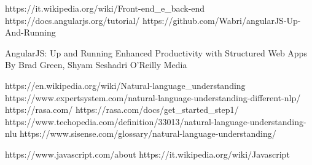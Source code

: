 \begin{thebibliography}{99}

https://it.wikipedia.org/wiki/Front-end_e_back-end
https://docs.angularjs.org/tutorial/
https://github.com/Wabri/angularJS-Up-And-Running

AngularJS: Up and Running
Enhanced Productivity with Structured Web Apps
By Brad Green, Shyam Seshadri 
O'Reilly Media

https://en.wikipedia.org/wiki/Natural-language_understanding
https://www.expertsystem.com/natural-language-understanding-different-nlp/
https://rasa.com/
https://rasa.com/docs/get_started_step1/
https://www.techopedia.com/definition/33013/natural-language-understanding-nlu
https://www.sisense.com/glossary/natural-language-understanding/

https://www.javascript.com/about
https://it.wikipedia.org/wiki/Javascript



\end{thebibliography}
